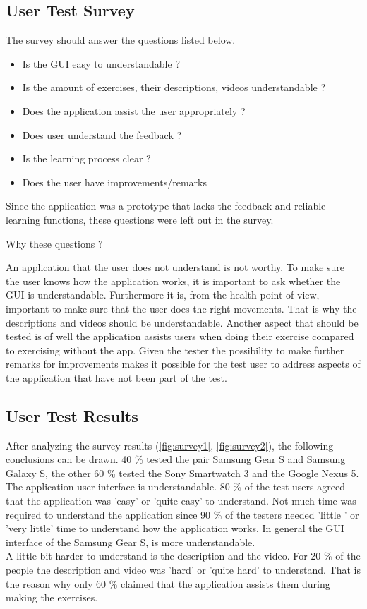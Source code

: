 \subsection{User Test Survey}
The survey should answer the questions listed below.
\begin{itemize}
\item Is the GUI easy to understandable ?
\item Is the amount of exercises, their descriptions, videos understandable ?
\item Does the application assist the user appropriately ?
\item Does user understand the feedback ?
\item Is the learning process clear ?
\item Does the user have improvements/remarks
\end{itemize}
Since the application was a prototype that lacks the feedback and reliable learning functions, these questions were left out in the survey.\\
\newline
\newline
\begin{Large}
Why these questions ?\\

\end{Large}
An application that the user does not understand is not worthy. To make sure the user knows how the application works, it is important to ask whether the GUI is understandable.
Furthermore it is, from the health point of view, important to make sure that the user does the right movements. That is why the descriptions and videos should be understandable. Another aspect that should be tested is of well the application assists users when doing their exercise compared to exercising without the app.
Given the tester the possibility to make further remarks for improvements makes it possible for the test user to address aspects of the application that have not been part of the test.

\subsection{User Test Results}
After analyzing the survey results (\ref{fig:survey1}, \ref{fig:survey2}), the following conclusions can be drawn. 40 \% tested the pair Samsung Gear S and Samsung Galaxy S, the other 60 \% tested the Sony Smartwatch 3 and the Google Nexus 5.
\\
The application user interface is understandable. 80 \% of the test users agreed that the application was 'easy' or 'quite easy' to understand. Not much time was required to understand the application since 90 \% of the testers needed 'little ' or 'very little' time to understand how the application works. In general the GUI interface of the Samsung Gear S, is more understandable.\\
A little bit harder to understand is the description and the video. For 20 \% of the people the description and video was 'hard' or 'quite hard' to understand. That is the reason why only 60 \% claimed that the application assists them during making the exercises.